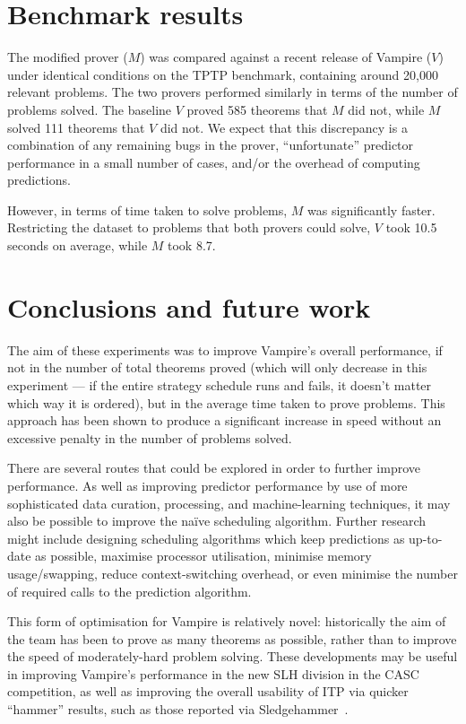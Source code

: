 \documentclass{scrartcl}
\begin{document}
\section{Benchmark results}
The modified prover (\(M\)) was compared against a recent release of Vampire (\(V\)) under identical conditions on the TPTP benchmark, containing around 20,000 relevant problems.
The two provers performed similarly in terms of the number of problems solved.
The baseline \(V\) proved 585 theorems that \(M\) did not, while \(M\) solved 111 theorems that \(V\) did not.
We expect that this discrepancy is a combination of any remaining bugs in the prover, ``unfortunate'' predictor performance in a small number of cases, and/or the overhead of computing predictions.

However, in terms of time taken to solve problems, \(M\) was significantly faster.
Restricting the dataset to problems that both provers could solve, \(V\) took 10.5 seconds on average, while \(M\) took 8.7.

\section{Conclusions and future work}
The aim of these experiments was to improve Vampire's overall performance, if not in the number of total theorems proved (which will only decrease in this experiment --- if the entire strategy schedule runs and fails, it doesn't matter which way it is ordered), but in the average time taken to prove problems.
This approach has been shown to produce a significant increase in speed without an excessive penalty in the number of problems solved.

There are several routes that could be explored in order to further improve performance.
As well as improving predictor performance by use of more sophisticated data curation, processing, and machine-learning techniques, it may also be possible to improve the na\"ive scheduling algorithm.
Further research might include designing scheduling algorithms which keep predictions as up-to-date as possible, maximise processor utilisation, minimise memory usage/swapping, reduce context-switching overhead, or even minimise the number of required calls to the prediction algorithm.

This form of optimisation for Vampire is relatively novel: historically the aim of the team has been to prove as many theorems as possible, rather than to improve the speed of moderately-hard problem solving.
These developments may be useful in improving Vampire's performance in the new SLH division in the CASC competition, as well as improving the overall usability of ITP via quicker ``hammer'' results, such as those reported via Sledgehammer~\cite{sledgehammer}.



\end{document}

